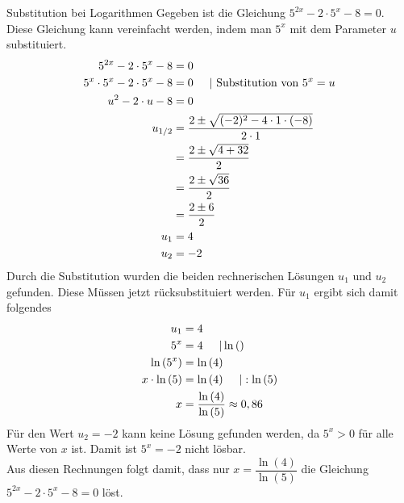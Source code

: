 \begin{bsp}{Substitution bei Logarithmen}{}
\mbox{}
Gegeben ist die Gleichung $5^{2x} -2\cdot 5^x -8 =0$. Diese Gleichung kann vereinfacht werden, indem man $5^x$ mit dem Parameter $u$ substituiert.
\begin{equation*}
    \begin{split}
     5^{2x} -2\cdot 5^x -8 &=0\\
     5^x\cdot 5^x -2\cdot 5^x -8 &=0\hspace{0.5cm} | \text{ Substitution von } 5^x=u\\
        u^2 -2\cdot u -8 &=0\\
        u_{1/2} &= \dfrac{2\pm \sqrt{(-2)^2 -4\cdot 1\cdot (-8)}}{2\cdot 1}\\
        &=\dfrac{2\pm \sqrt{4+32}}{2}\\
        &=\dfrac{2\pm \sqrt{36}}{2}\\
        &= \dfrac{2\pm 6}{2}\\
        u_1 &= 4\\
        u_2 &= -2 
    \end{split}
\end{equation*}
Durch die Substitution wurden die beiden rechnerischen Lösungen $u_1$ und $u_2$ gefunden. Diese Müssen jetzt rücksubstituiert werden. Für $u_1$ ergibt sich damit folgendes
\begin{equation*}
    \begin{split}
u_1&=4\\
5^x&=4\hspace{0.5cm} | \ln{()}\\
\ln{(5^x)}&= \ln{(4)}\\
x\cdot\ln{(5)} &= \ln{(4)}\hspace{0.5cm }| : \ln{(5)}\\
x&= \dfrac{\ln{(4)} }{\ln{(5)} } \approx 0,86
    \end{split}
\end{equation*}
Für den Wert $u_2 = -2$ kann keine Lösung gefunden werden, da $5^x > 0$ für alle Werte von $x$ ist. Damit ist $5^x= -2$ nicht lösbar.\\
Aus diesen Rechnungen folgt damit, dass nur $x=\dfrac{\ln{(4)}}{\ln{(5)}}$ die Gleichung $5^{2x} -2\cdot 5^x -8 =0$ löst.
\end{bsp}